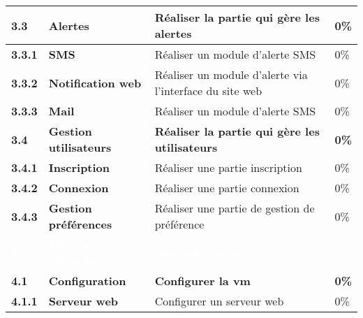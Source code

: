 \begin{supertabular}{|p{1.5cm} p{6cm}|p{5cm}|R{2cm}|}
  \textbf{3.3}  & \textbf{Alertes} & \textbf{Réaliser la partie qui gère les alertes} & \textbf{0\%} \\
  \hline

  \hspace{6pt}
  \textbf{3.3.1}  & \textbf{SMS} & Réaliser un module d'alerte SMS  & 0\% \\
  \hline

  \hspace{6pt}
  \textbf{3.3.2}  & \textbf{Notification web} & Réaliser un module d'alerte via l'interface du site web & 0\% \\
  \hline

  \hspace{6pt}
  \textbf{3.3.3}  & \textbf{Mail} & Réaliser un module d'alerte SMS & 0\% \\
  \hline


  \textbf{3.4}  & \textbf{Gestion utilisateurs} & \textbf{Réaliser la partie qui gère les utilisateurs} & \textbf{0\%} \\
  \hline

  \hspace{6pt}
  \textbf{3.4.1}  & \textbf{Inscription} & Réaliser une partie inscription & 0\% \\
  \hline

  \hspace{6pt}
  \textbf{3.4.2}  & \textbf{Connexion} & Réaliser une partie connexion & 0\% \\
  \hline

  \hspace{6pt}
  \textbf{3.4.3}  & \textbf{Gestion préférences} & Réaliser une partie de gestion de préférence & 0\% \\
  \hline





  \textcolor{white}{\textbf{4}}  & \textcolor{white}{\textbf{Machine virtuelle}} & \textcolor{white}{\textbf{Réaliser une vm}} & \textcolor{white}{\textbf{0\%}} \\
  \hline

  \textbf{4.1}  & \textbf{Configuration} & \textbf{Configurer la vm} & \textbf{0\%} \\
  \hline

  \hspace{6pt}
  \textbf{4.1.1}  & \textbf{Serveur web} & Configurer un serveur web & 0\% \\
  \hline


\end{supertabular}
